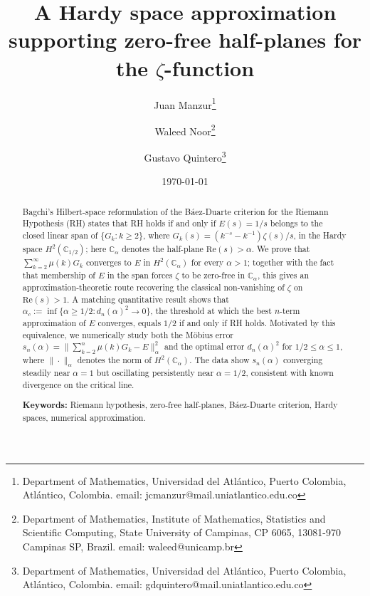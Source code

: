 \documentclass[11pt]{extarticle}
\numberwithin{equation}{section}
\newcommand{\C}{\mathbb{C}}
\theoremstyle{plain}
\theoremstyle{definition}
\begin{document}
\title{A Hardy space approximation supporting zero-free half-planes for the $\zeta$-function}

\author{
    Juan Manzur\thanks{Department of Mathematics,
    Universidad del Atlántico, Puerto Colombia, Atlántico, Colombia. email: jcmanzur@mail.uniatlantico.edu.co}
    \and
    Waleed Noor\thanks{Department of Mathematics,
    Institute of Mathematics, Statistics and Scientific Computing,
    State University of Campinas, CP 6065, 13081-970 Campinas
    SP, Brazil. email: waleed@unicamp.br}
    \and
    Gustavo Quintero\thanks{Department of Mathematics, Universidad del Atlántico, Puerto Colombia, Atlántico, Colombia. email: gdquintero@mail.uniatlantico.edu.co}
}

\date\today
\maketitle

\begin{abstract}

 Bagchi's Hilbert-space reformulation of the Báez-Duarte criterion \cite{baez} for the Riemann Hypothesis (RH) \cite{bagchi} states that RH holds if and only if $E(s)=1/s$ belongs to the closed linear span of $\{G_k : k\geq 2\}$, where $G_k(s)=(k^{-s}-k^{-1})\zeta(s)/s$, in the Hardy space $H^2(\C_{1/2})$; here $\C_\alpha$ denotes the half-plane $\mathrm{Re}(s)>\alpha$. We prove that $\sum_{k=2}^{\infty}\mu(k)G_k$ converges to $E$ in $H^2(\C_\alpha)$ for every $\alpha>1$; together with the fact that membership of $E$ in the span forces $\zeta$ to be zero-free in $\C_\alpha$, this gives an approximation-theoretic route recovering the classical non-vanishing of $\zeta$ on
$\mathrm{Re}(s)>1$. A matching quantitative result shows that $\alpha_c := \inf\{\alpha\geq1/2 : d_n(\alpha)^2\to0\}$, the threshold at which the best $n$-term approximation of $E$ converges, equals $1/2$ if and only if RH holds. Motivated by this equivalence, we numerically study both the Möbius error $s_n(\alpha) = \|\sum_{k=2}^n\mu(k)G_k - E\|^2_\alpha$ and the optimal error $d_n(\alpha)^2$ for $1/2\leq\alpha\leq1$, where $\|\cdot\|_\alpha$ denotes the norm of $H^2(\C_\alpha)$. The data show $s_n(\alpha)$ converging steadily near $\alpha=1$ but oscillating persistently near $\alpha=1/2$, consistent with known divergence on the critical line.

\bigskip
\noindent
\textbf{Keywords:} Riemann hypothesis, zero-free half-planes, B\'aez-Duarte criterion, Hardy spaces, numerical approximation.

\end{abstract}
\end{document}
